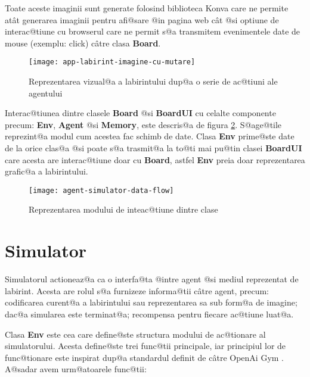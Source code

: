 Toate aceste imaginii sunt generate folosind biblioteca Konva care ne permite at\^ at generarea imaginii pentru afi@sare @in pagina web c\^ at @si optiune de interac@tiune cu browserul care ne permit s@a transmitem evenimentele date de mouse (exemplu: click) c\^ atre clasa \textbf{Board}.

\begin{figure}[h]
	\centering
	\texttt{[image: app-labirint-imagine-cu-mutare]}
	\caption{Reprezentarea vizual@a a labirintului dup@a o serie de ac@tiuni ale agentului}
	\label{fig:labirint-imagine-cu-mutare}
\end{figure}

Interac@tiunea dintre clasele \textbf{Board} @si \textbf{BoardUI} cu celalte componente precum: \textbf{Env}, \textbf{Agent} @si \textbf{Memory}, este descris@a de figura \ref{fig:agent-simulator-data-flow}. S@age@tile reprezint@a modul cum acestea fac schimb de date. Clasa \textbf{Env} prime@ste date de la orice clas@a @si poate s@a trasmit@a la to@ti mai pu@tin clasei \textbf{BoardUI} care acesta are interac@tiune doar cu \textbf{Board}, astfel \textbf{Env} preia doar reprezentarea grafic@a a labirintului.

\begin{figure}[h]
	\centering
	\texttt{[image: agent-simulator-data-flow]}
	\caption{Reprezentarea modului de inteac@tiune dintre clase}
	\label{fig:agent-simulator-data-flow}
\end{figure}





\section{Simulator}


Simulatorul actioneaz@a ca o interfa@ta @intre agent @si mediul reprezentat de labirint. Acesta are rolul s@a furnizeze informa@tii c\^ atre agent, precum: codificarea curent@a a labirintului sau reprezentarea sa sub form@a de imagine; dac@a simularea este terminat@a; recompensa pentru fiecare ac@tiune luat@a.

Clasa \textbf{Env} este cea care define@ste structura modului de ac@tionare al simulatorului. Acesta define@ste trei func@tii principale, iar principiul lor de func@tionare este inspirat dup@a standardul definit de c\^ atre OpenAi Gym \cite{open-ai-gym-env-format}. A@sadar avem urm@atoarele func@tii:

